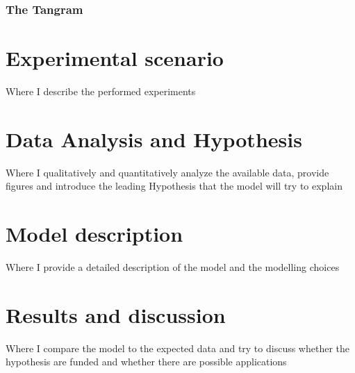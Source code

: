 \documentclass[a4paper,singleside,12pt]{report} %
\begin{document}
	\subsection{The Tangram}
    \chapter{Experimental scenario}
    Where I describe the performed experiments
    \chapter{Data Analysis and Hypothesis}
    Where I qualitatively and quantitatively analyze the available data, provide figures and introduce
    the leading Hypothesis that the model will try to explain
    \chapter{Model description}
    Where I provide a detailed description of the model and the modelling choices
    \chapter{Results and discussion}
    Where I compare the model to the expected data and try to discuss whether the hypothesis are funded
    and whether there are possible applications
	\appendix
	
	\printbibliography[heading=bibintoc] %

	
	\acknowledgements
		
		
\end{document}
